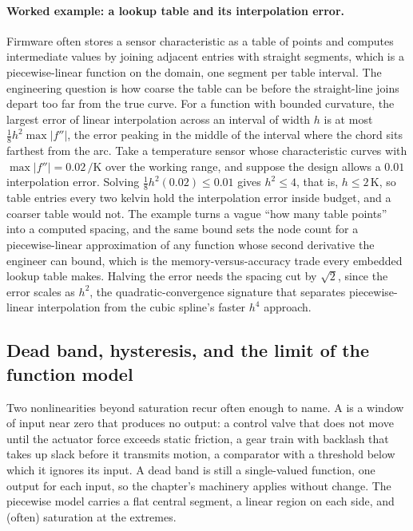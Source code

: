 \paragraph{Worked example: a lookup table and its interpolation error.}
Firmware often stores a sensor characteristic as a table of points and
computes intermediate values by joining adjacent entries with straight
segments, which is a piecewise-linear function on the domain, one
segment per table interval. The engineering question is how coarse the
table can be before the straight-line joins depart too far from the
true curve. For a function with bounded curvature, the largest error of
linear interpolation across an interval of width $h$ is at most
$\tfrac{1}{8} h^2 \max|f''|$, the error peaking in the middle of the
interval where the chord sits farthest from the arc. Take a temperature
sensor whose characteristic curves with $\max|f''| = 0.02\,\si
{\per\kelvin}$ over the working range, and suppose the design allows a
$0.01$ interpolation error. Solving $\tfrac{1}{8} h^2 (0.02) \leq 0.01$
gives $h^2 \leq 4$, that is, $h \leq 2\,\si{\kelvin}$, so table entries
every two kelvin hold the interpolation error inside budget, and a
coarser table would not. The example turns a vague ``how many table
points'' into a computed spacing, and the same bound sets the node
count for a piecewise-linear approximation of any function whose second
derivative the engineer can bound, which is the memory-versus-accuracy
trade every embedded lookup table makes. Halving the error needs the
spacing cut by $\sqrt{2}$, since the error scales as $h^2$, the
quadratic-convergence signature that separates piecewise-linear
interpolation from the cubic spline's faster $h^4$ approach.

\subsection{Dead band, hysteresis, and the limit of the function model}

Two nonlinearities beyond saturation recur often enough to name. A
 is a window of input near zero that produces no
output: a control valve that does not move until the actuator force
exceeds static friction, a gear train with backlash that takes up
slack before it transmits motion, a comparator with a threshold below
which it ignores its input. A dead band is still a single-valued
function, one output for each input, so the chapter's machinery
applies without change. The piecewise model carries a flat central
segment, a linear region on each side, and (often) saturation at the
extremes.

